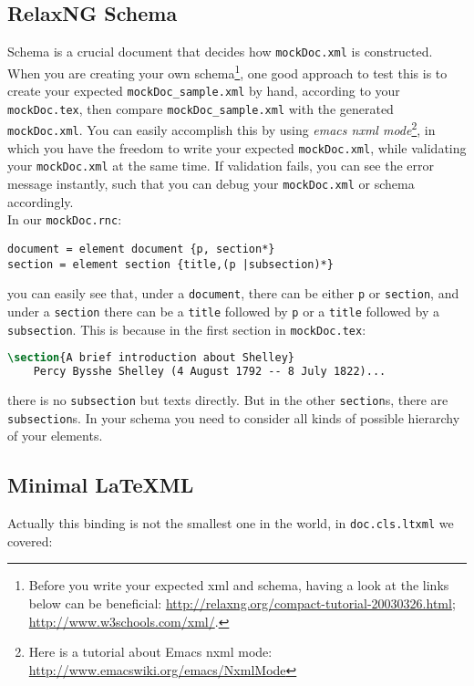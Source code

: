 \documentclass[a4paper]{article}
\begin{document}
\subsection{RelaxNG Schema}
Schema is a crucial document that decides how \texttt{mockDoc.xml} is constructed. When you are creating your own schema\footnote{Before you write your expected xml and schema, having a look at the links below can be beneficial: \url{http://relaxng.org/compact-tutorial-20030326.html}; \url{http://www.w3schools.com/xml/}. }, one good approach to test this is to create your expected \texttt{mockDoc\_sample.xml} by hand, according to your \texttt{mockDoc.tex}, then compare \texttt{mockDoc\_sample.xml} with the generated \texttt{mockDoc.xml}. You can easily accomplish this by using \textit{emacs nxml mode}\footnote{Here is a tutorial about Emacs nxml mode: \url{http://www.emacswiki.org/emacs/NxmlMode}}, in which you have the freedom to write your expected \texttt{mockDoc.xml}, while validating your \texttt{mockDoc.xml} at the same time. If validation fails, you can see the error message instantly, such that you can debug your \texttt{mockDoc.xml} or schema accordingly.\\

\noindent In our \texttt{mockDoc.rnc}:
\begin{lstlisting}
document = element document {p, section*}
section = element section {title,(p |subsection)*}
\end{lstlisting}
you can easily see that, under a \texttt{document}, there can be either \texttt{p} or \texttt{section}, and under a \texttt{section} there can be a \texttt{title} followed by \texttt{p} or a \texttt{title} followed by a \texttt{subsection}. This is because in the first section in \texttt{mockDoc.tex}:
\begin{lstlisting}[language=TeX]
\section{A brief introduction about Shelley}
    Percy Bysshe Shelley (4 August 1792 -- 8 July 1822)...
\end{lstlisting}
there is no \texttt{subsection} but texts directly. But in the other \texttt{section}s, there are \texttt{subsection}s. In your schema you need to consider all kinds of possible hierarchy of your elements.

\subsection{Minimal \LaTeX ML}
Actually this binding is not the smallest one in the world, in \texttt{doc.cls.ltxml} we covered:\\
\end{document}
